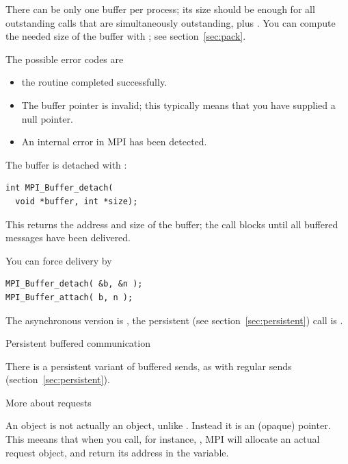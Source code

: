 
There can be only one buffer per process; its size should be enough
for all outstanding  calls that are simultaneously
outstanding, plus .
You can compute the needed size of the buffer with ;
see section~\ref{sec:pack}.


The possible error codes are
\begin{itemize}
\item {} the routine completed successfully.
\item {} The buffer pointer is invalid;
  this typically means that you have supplied a null pointer.
\item {} An internal error in MPI has been detected.
\end{itemize}

The buffer is detached with :
\begin{lstlisting}
int MPI_Buffer_detach(
  void *buffer, int *size);
\end{lstlisting}
This returns the address and size of the buffer; the call blocks
until all buffered messages have been delivered.

You can force delivery by
\begin{lstlisting}
MPI_Buffer_detach( &b, &n );
MPI_Buffer_attach( b, n );
\end{lstlisting}

The asynchronous version is , the persistent
(see section~\ref{sec:persistent}) call is .

 {Persistent buffered communication}

There is a persistent variant of buffered sends, as with regular
sends (section~\ref{sec:persistent}).


 {More about requests}
\label{ref:mpirequest}

An  object is not actually an object,
unlike . Instead it is an (opaque) pointer.
This meeans that when you call, for instance, ,
MPI will allocate an actual request object, and return its
address in the  variable.


